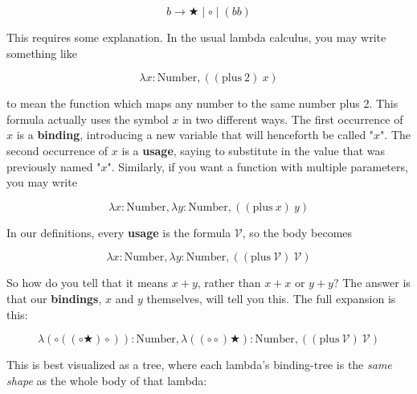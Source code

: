 \documentclass{article}
\newcommand{\usage}{\mathcal{V}}
\newcommand{\bindvariable}{\bigstar}
\newcommand{\bindnotthis}{\circ}
\begin{document}
  \[b \rightarrow \bindvariable \mid \bindnotthis \mid (b b) \]

  This requires some explanation. In the usual lambda calculus, you may write something like

  \[ \lambda x : \mathrm{Number}, ((\mathrm{plus}\ 2)\ x) \]

  to mean the function which maps any number to the same number plus 2. This formula actually uses the symbol $x$ in two different ways. The first occurrence of $x$ is a \textbf{binding}, introducing a new variable that will henceforth be called "$x$". The second occurrence of $x$ is a \textbf{usage}, saying to substitute in the value that was previously named "$x$". Similarly, if you want a function with multiple parameters, you may write
  
  \[ \lambda x : \mathrm{Number}, \lambda y : \mathrm{Number}, ((\mathrm{plus}\ x)\ y) \]

  In our definitions, every \textbf{usage} is the formula $\usage$, so the body becomes
  
  \[ \lambda x : \mathrm{Number}, \lambda y : \mathrm{Number}, ((\mathrm{plus}\ \usage)\ \usage) \]
  
  So how do you tell that it means $x + y$, rather than $x + x$ or $y + y$? The answer is that our \textbf{bindings}, $x$ and $y$ themselves, will tell you this. The full expansion is this:
  
  \[ \lambda (\bindnotthis((\bindnotthis \bindvariable) \bindnotthis)) : \mathrm{Number}, \lambda ((\bindnotthis \bindnotthis) \bindvariable) : \mathrm{Number}, ((\mathrm{plus}\ \usage)\ \usage) \]
  
  This is best visualized as a tree, where each lambda's binding-tree is the \emph{same shape} as the whole body of that lambda:
  
\end{document}
